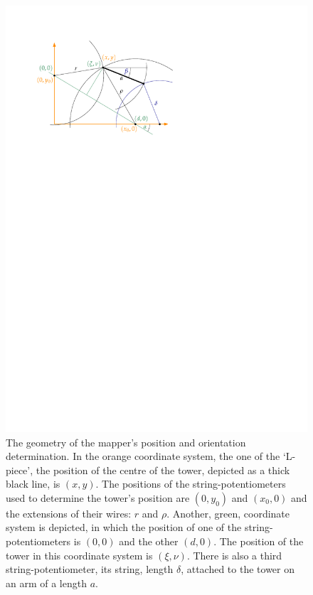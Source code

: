 \begin{figure}
  \centering
  \includegraphics[width=0.8\linewidth]{gfx/mapping/geometry.pdf}
  \caption{The geometry of the mapper's position and orientation determination. In the orange coordinate system, the one of the `L-piece', the position of the centre of the tower, depicted as a thick black line, is $(x,y)$. The positions of the string-potentiometers used to determine the tower's position are $(0, y_0)$ and $(x_0, 0)$ and the extensions of their wires: $r$ and $\rho$. Another, green, coordinate system is depicted, in which the position of one of the string-potentiometers is $(0,0)$ and the other $(d, 0)$. The position of the tower in this coordinate system is $(\xi, \nu)$. There is also a third string-potentiometer, its string, length $\delta$, attached to the tower on an arm of a length $a$.}\label{fig:mapping_geometry}
\end{figure}

